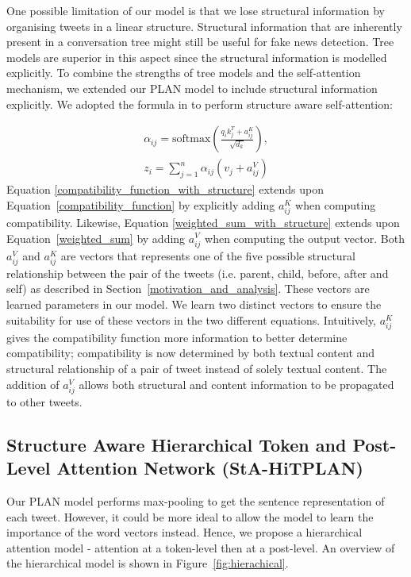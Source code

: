 \documentclass[letterpaper]{article} %
\begin{document}
One possible limitation of our model is that we lose structural information by organising tweets in a linear structure. Structural information that are inherently present in a conversation tree might still be useful for fake news detection. Tree models are superior in this aspect since the structural information is modelled explicitly. To combine the strengths of tree models and the self-attention mechanism, we extended our PLAN model to include structural information explicitly. We adopted the formula in \citet{shaw-etal-2018-self} to perform structure aware self-attention:

\begin{eqnarray}
\alpha_{ij} = \mathrm{softmax}(\frac{q_{i}k_{j}^T + a_{ij}^K}{\sqrt{d_{k}}}) \label{compatibility_function_with_structure}, \\
z_i = \sum_{j=1}^{n} \alpha_{ij} (v_j + a_{ij}^V) \label{weighted_sum_with_structure}
\end{eqnarray}
Equation \ref{compatibility_function_with_structure} extends upon Equation~\ref{compatibility_function} by explicitly adding $a_{ij}^K$ when computing compatibility. Likewise, Equation \ref{weighted_sum_with_structure} extends upon Equation~\ref{weighted_sum} by adding $a_{ij}^V$ when computing the output vector.
Both $a_{ij}^V$ and $a_{ij}^K$ are vectors that represents one of the five possible structural relationship between the pair of the tweets (i.e. parent, child, before, after and self) as described in Section~\ref{motivation_and_analysis}. These vectors are learned parameters in our model. We learn two distinct vectors to ensure the suitability for use of these vectors in the two different equations.
Intuitively, $a_{ij}^K$ gives the compatibility function more information to better determine compatibility; compatibility is now determined by both textual content and structural relationship of a pair of tweet instead of solely textual content. The addition of $a_{ij}^V$ allows both structural and content information to be propagated to other tweets.

\subsection{Structure Aware Hierarchical Token and Post-Level Attention Network (StA-HiTPLAN)}
\label{sec:stahitplan}
Our PLAN model performs max-pooling to get the sentence representation of each tweet. However, it could be more ideal to allow the model to learn the importance of the word vectors instead. Hence, we propose a hierarchical attention model - attention at a token-level then at a post-level. An overview of the hierarchical model is shown in Figure~\ref{fig:hierachical}.
\end{document}
